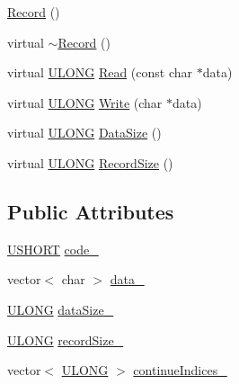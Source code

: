 \begin{DoxyCompactItemize}
\item 
\hyperlink{class_y_excel_1_1_record_abee06ee5b236b6272e1669e81bca2a79}{Record} ()
\item 
virtual \hyperlink{class_y_excel_1_1_record_aa237852d87a79b3b0cda41c628cf111d}{$\sim$\+Record} ()
\item 
virtual \hyperlink{_basic_excel_8hpp_abe09d1bea023be6a07cbadde8e955435}{U\+L\+O\+N\+G} \hyperlink{class_y_excel_1_1_record_a1d7a0995ea1ad63f91beef5d501c2378}{Read} (const char $\ast$data)
\item 
virtual \hyperlink{_basic_excel_8hpp_abe09d1bea023be6a07cbadde8e955435}{U\+L\+O\+N\+G} \hyperlink{class_y_excel_1_1_record_a40acc5b533a440874d6a8eec88e76cea}{Write} (char $\ast$data)
\item 
virtual \hyperlink{_basic_excel_8hpp_abe09d1bea023be6a07cbadde8e955435}{U\+L\+O\+N\+G} \hyperlink{class_y_excel_1_1_record_aa1c8ae665b9821bc0142745a295a6a45}{Data\+Size} ()
\item 
virtual \hyperlink{_basic_excel_8hpp_abe09d1bea023be6a07cbadde8e955435}{U\+L\+O\+N\+G} \hyperlink{class_y_excel_1_1_record_ac3ebf89e31bce2970946a477a19816f2}{Record\+Size} ()
\end{DoxyCompactItemize}
\subsection*{Public Attributes}
\begin{DoxyCompactItemize}
\item 
\hyperlink{_basic_excel_8hpp_a5850d5316caf7f4cedd742fdf8cd7c02}{U\+S\+H\+O\+R\+T} \hyperlink{class_y_excel_1_1_record_a09d4f522825ca080f13cef27e91a4029}{code\+\_\+}
\item 
vector$<$ char $>$ \hyperlink{class_y_excel_1_1_record_a1285e95d5c34524d474768731d9b67b2}{data\+\_\+}
\item 
\hyperlink{_basic_excel_8hpp_abe09d1bea023be6a07cbadde8e955435}{U\+L\+O\+N\+G} \hyperlink{class_y_excel_1_1_record_a779cadbcd3bd561a07da5fa1d427658c}{data\+Size\+\_\+}
\item 
\hyperlink{_basic_excel_8hpp_abe09d1bea023be6a07cbadde8e955435}{U\+L\+O\+N\+G} \hyperlink{class_y_excel_1_1_record_a4d726030a31687be0637f0a51f5877dd}{record\+Size\+\_\+}
\item 
vector$<$ \hyperlink{_basic_excel_8hpp_abe09d1bea023be6a07cbadde8e955435}{U\+L\+O\+N\+G} $>$ \hyperlink{class_y_excel_1_1_record_ad9cae1d6757196deb6ee916bd643fa4e}{continue\+Indices\+\_\+}
\end{DoxyCompactItemize}


